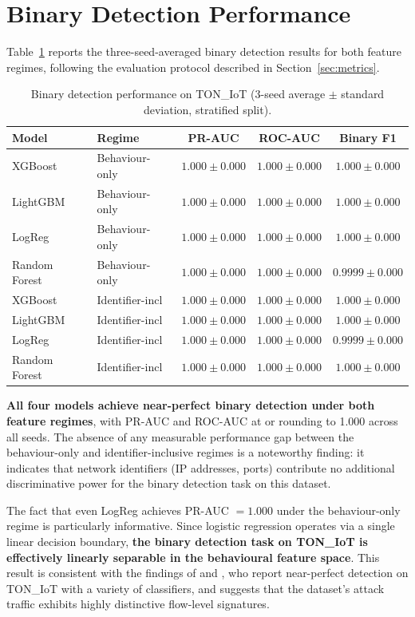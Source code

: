 \documentclass[12pt,a4paper]{report}
\begin{document}
\section{Binary Detection Performance}
\label{sec:binary-results}

Table~\ref{tab:binary} reports the three-seed-averaged binary detection results for both feature regimes, following the evaluation protocol described in Section~\ref{sec:metrics}.

\begin{table}[H]
\centering
\caption{Binary detection performance on TON\_IoT (3-seed average $\pm$ standard deviation, stratified split).}
\label{tab:binary}
\begin{tabular}{llccc}
\toprule
\textbf{Model} & \textbf{Regime} & \textbf{PR-AUC} & \textbf{ROC-AUC} & \textbf{Binary F1} \\
\midrule
XGBoost & Behaviour-only & $1.000 \pm 0.000$ & $1.000 \pm 0.000$ & $1.000 \pm 0.000$ \\
LightGBM & Behaviour-only & $1.000 \pm 0.000$ & $1.000 \pm 0.000$ & $1.000 \pm 0.000$ \\
LogReg & Behaviour-only & $1.000 \pm 0.000$ & $1.000 \pm 0.000$ & $1.000 \pm 0.000$ \\
Random Forest & Behaviour-only & $1.000 \pm 0.000$ & $1.000 \pm 0.000$ & $0.9999 \pm 0.000$ \\
\midrule
XGBoost & Identifier-incl & $1.000 \pm 0.000$ & $1.000 \pm 0.000$ & $1.000 \pm 0.000$ \\
LightGBM & Identifier-incl & $1.000 \pm 0.000$ & $1.000 \pm 0.000$ & $1.000 \pm 0.000$ \\
LogReg & Identifier-incl & $1.000 \pm 0.000$ & $1.000 \pm 0.000$ & $0.9999 \pm 0.000$ \\
Random Forest & Identifier-incl & $1.000 \pm 0.000$ & $1.000 \pm 0.000$ & $1.000 \pm 0.000$ \\
\bottomrule
\end{tabular}
\end{table}

\textbf{All four models achieve near-perfect binary detection under both feature regimes}, with PR-AUC and ROC-AUC at or rounding to 1.000 across all seeds. The absence of any measurable performance gap between the behaviour-only and identifier-inclusive regimes is a noteworthy finding: it indicates that network identifiers (IP addresses, ports) contribute no additional discriminative power for the binary detection task on this dataset.

The fact that even LogReg achieves PR-AUC $= 1.000$ under the behaviour-only regime is particularly informative. Since logistic regression operates via a single linear decision boundary, \textbf{the binary detection task on TON\_IoT is effectively linearly separable in the behavioural feature space}. This result is consistent with the findings of \citet{alsaedi2020} and \citet{moustafa2021}, who report near-perfect detection on TON\_IoT with a variety of classifiers, and suggests that the dataset's attack traffic exhibits highly distinctive flow-level signatures.
\end{document}
